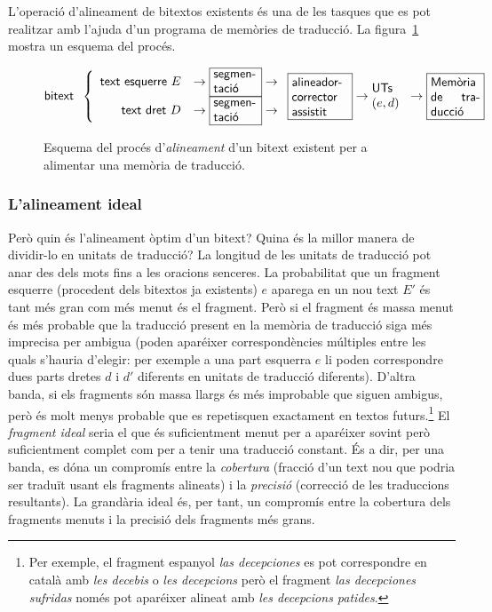 L'operació d'alineament de bitextos existents és una de les tasques
que es pot realitzar amb l'ajuda d'un programa de memòries de
traducció. La figura~\ref{fg:aliMT} mostra un esquema del procés.
\begin{figure}
{\small
$$
\mbox{\textsf{bitext}}\;\;\left\{\begin{array}{rcl}
\mbox{\textsf{text esquerre $E$}} &\to \mbox{\framebox{\parbox{1.25cm}{\textsf{segmen-
      tació}}}} 
\to \\
\mbox{\textsf{text dret $D$}} &\to \mbox{\framebox{\parbox{1.25cm}{\textsf{segmen- tació}}}} 
\to \\
\end{array}
\right.
\mbox{\framebox{\parbox{1.6cm}{\textsf{alineador- corrector assistit}}}}
\to \mbox{\parbox{1cm}{\textsf{UTs} $(e,d)$}} \to \mbox{\framebox{\parbox{1.4cm}{\textsf{Memòria de traducció}}}}
$$
}
\caption{Esquema del procés d'\emph{alineament} d'un bitext existent per a alimentar
  una memòria de traducció.}
\label{fg:aliMT}
\end{figure}



\subsubsection{L'alineament ideal}

Però quin és l'alineament òptim d'un bitext? Quina és la millor manera
de dividir-lo en unitats de traducció?  La longitud de les unitats de
traducció pot anar des dels mots fins a les oracions senceres. La
probabilitat que un fragment esquerre (procedent dels bitextos ja
existents) $e$ aparega en un nou text $E'$ és tant més gran com més
menut és el fragment. Però si el fragment és massa menut és més
probable que la traducció present en la memòria de traducció siga més
imprecisa per ambigua (poden aparéixer correspondències múltiples
entre les quals s'hauria d'elegir: per exemple a una part esquerra $e$
li poden correspondre dues parts dretes $d$ i $d'$ diferents en
unitats de traducció diferents).  D'altra banda, si els fragments són
massa llargs és més improbable que siguen ambigus, però és molt menys probable que es repetisquen exactament en
textos futurs.\footnote{Per
  exemple, el fragment espanyol \emph{las decepciones} es pot
  correspondre en català amb \emph{les decebis} o \emph{les
    decepcions} però el fragment \emph{las decepciones sufridas} només
  pot aparéixer alineat amb \emph{les decepcions patides}.} El
\emph{fragment ideal} seria el que és suficientment menut per a
aparéixer sovint però suficientment complet com per a tenir una
traducció constant. És a dir, per una banda, es dóna un compromís
entre la \emph{cobertura} (fracció d'un text nou que podria ser
traduït usant els fragments alineats) i la \emph{precisió} (correcció
de les traduccions resultants).  La grandària ideal és, per tant, un
compromís entre la cobertura dels fragments menuts i la precisió dels
fragments més grans.


